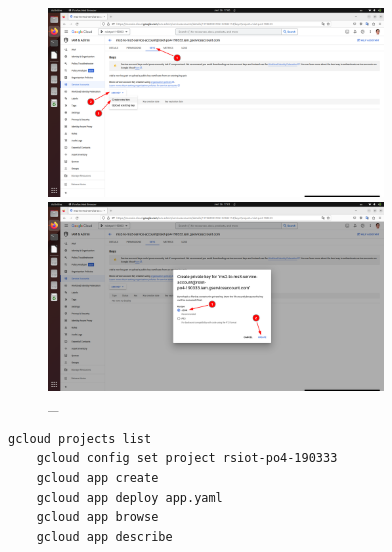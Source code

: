 \documentclass[12pt, a4paper, simple]{eskdtext}
\begin{document}
  \begin{figure}[!h]
    \centering
  
    \begin{minipage}{0.49\textwidth}
      \centering
  
      \includegraphics[height=5cm]
      {images/2023-02-26_17-00-46.png}
  
      \caption{\_}
  
      \label{fig:11}
    \end{minipage}
    \begin{minipage}{0.49\textwidth}
      \centering
  
      \includegraphics[height=5cm]
      {images/2023-02-26_17-01-18.png}
  
      \caption{\_}
  
      \label{fig:12}
    \end{minipage}
  \end{figure}

  \newpage

  

  

  

  

  \newpage

  \begin{lstlisting}[language=bash,name=Загрузка MS3 на Google Cloud App Engine]
    gcloud projects list
    gcloud config set project rsiot-po4-190333
    gcloud app create
    gcloud app deploy app.yaml
    gcloud app browse
    gcloud app describe
  \end{lstlisting}
\end{document}
